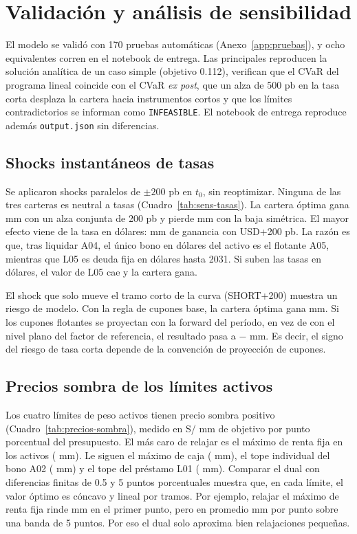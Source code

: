 \section{Validación y análisis de sensibilidad}\label{sec:sensibilidad}

El modelo se validó con 170 pruebas automáticas (Anexo~\ref{app:pruebas}), y ocho equivalentes corren en
el notebook de entrega. Las principales reproducen la solución analítica de un caso simple (objetivo 0.112),
verifican que el CVaR del programa lineal coincide con el CVaR \emph{ex post}, que un alza de 500 pb en la
tasa corta desplaza la cartera hacia instrumentos cortos y que los límites contradictorios se informan como
\texttt{INFEASIBLE}. El notebook de entrega reproduce además \texttt{output.json} sin diferencias.

\subsection{Shocks instantáneos de tasas}\label{subsec:shocks-tasas}
Se aplicaron shocks paralelos de $\pm 200$ pb en $t_0$, sin reoptimizar. Ninguna de las tres carteras es
neutral a tasas (Cuadro~\ref{tab:sens-tasas}). La cartera óptima gana  mm con un alza conjunta de
200 pb y pierde  mm con la baja simétrica. El mayor efecto viene de la tasa en dólares:
 mm de ganancia con USD+200 pb. La razón es que, tras liquidar A04, el único bono en dólares del
activo es el flotante A05, mientras que L05 es deuda fija en dólares hasta 2031. Si suben las tasas en
dólares, el valor de L05 cae y la cartera gana.

El shock que solo mueve el tramo corto de la curva (SHORT+200) muestra un riesgo de modelo. Con la regla de
cupones base, la cartera óptima gana  mm. Si los cupones flotantes se proyectan con la forward del
período, en vez de con el nivel plano del factor de referencia, el resultado pasa a \mbox{$-$} mm.
Es decir, el signo del riesgo de tasa corta depende de la convención de proyección de cupones.



\subsection{Precios sombra de los límites activos}
Los cuatro límites de peso activos tienen precio sombra positivo (Cuadro~\ref{tab:precios-sombra}), medido
en S/ mm de objetivo por punto porcentual del presupuesto. El más caro de relajar es el máximo de renta
fija en los activos ( mm). Le siguen el máximo de caja ( mm), el tope individual del bono
A02 ( mm) y el tope del préstamo L01 ( mm).
Comparar el dual con diferencias finitas de 0.5 y 5 puntos porcentuales muestra que, en cada límite, el
valor óptimo es cóncavo y lineal por tramos. Por ejemplo, relajar el máximo de renta fija rinde
 mm en el primer punto, pero en promedio  mm por punto sobre una banda de 5 puntos. Por eso
el dual solo aproxima bien relajaciones pequeñas.

